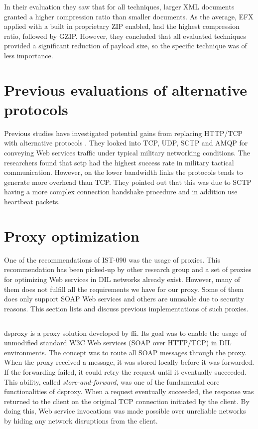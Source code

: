In their evaluation they saw that for all techniques, larger XML documents
granted a higher compression ratio than smaller documents. As the average, EFX
applied with a built in proprietary ZIP enabled, had the highest compression
ratio, followed by GZIP. However, they concluded that all evaluated techniques
provided a significant reduction of payload size, so the specific technique was
of less importance.


\section{Previous evaluations of alternative protocols}

Previous studies have investigated potential gains from replacing HTTP/TCP with
alternative protocols \cite{evaluation-transport-protocols-web-services}. They
looked into TCP, UDP, SCTP and AMQP for conveying Web services traffic under
typical military networking conditions. The researchers found that \gls{sctp}
had the highest success rate in military tactical communication. However, on the
lower bandwidth links the protocols tends to generate more overhead than TCP.
They pointed out that this was due to SCTP having a more complex connection
handshake procedure and in addition use heartbeat packets.

\section{Proxy optimization}

One of the recommendations of IST-090 was the usage of proxies. This
recommendation has been picked-up by other research group and a set of proxies
for optimizing Web services in DIL networks already exist. However, many of them
does not fulfill all the requirements we have for our proxy. Some of them does
only support SOAP Web services and others are unusable due to security reasons.
This section lists and discuss previous implementations of such proxies.

\subsection{}

\gls{dsproxy} is a proxy solution developed by
\gls{ffi}\cite{dsproxy-ffi}\cite{ieee-dsproxy}. Its goal was to enable the usage
of unmodified standard W3C Web services (SOAP over HTTP/TCP) in DIL
environments. The concept was to route all SOAP messages through the proxy. When
the proxy received a message, it was stored locally before it was forwarded. If
the forwarding failed, it could retry the request until it eventually succeeded.
This ability, called \textit{store-and-forward}, was one of the fundamental core
functionalities of \gls{dsproxy}. When a request eventually succeeded, the
response was returned to the client on the original TCP connection initiated by
the client. By doing this, Web service invocations was made possible over
unreliable networks by hiding any network disruptions from the client.

